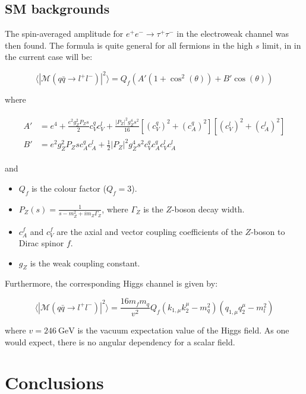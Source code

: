 \documentclass[11pt,a4paper]{article}
\begin{document}
\subsection{SM backgrounds}
The spin-averaged amplitude for $e^+e^- \rightarrow \tau^+\tau^-$ in the electroweak channel was then found. The formula is quite general for all fermions in the high $s$ limit, in in the current case will be:

\begin{equation}
	\langle|\mathcal{M}(q\bar{q}\rightarrow l^+l^-)|^2\rangle = Q_f\left(A'\left(1+\cos^2(\theta)\right) + B'\cos(\theta)\right)
\end{equation}

where

\begin{align}
	\begin{split}
	A' &= e^4 + \frac{e^2g_Z^2P_Zs}{2}c_V^qc_V^l + \frac{|P_Z|^2 g_Z^4 s^2}{16}\left[\left(c_V^q\right)^2 + \left(c_A^q\right)^2\right]\left[\left(c_V^l\right)^2 + \left(c_A^l\right)^2\right]\\
	B' &= e^2g_Z^2P_Zsc_A^qc_A^l + \frac{1}{2}|P_Z|^2g_Z^4s^2 c_V^qc_A^qc_V^l c_A^l
	\end{split}
\end{align}

and
\begin{itemize}
	\item $Q_f$ is the colour factor ($Q_f = 3$).
	\item $P_Z(s) = \frac{1}{s-m_Z^2 + im_Z\Gamma_Z}$, where $\Gamma_Z$ is the $Z$-boson decay width.
	\item $c^f_A$ and $c^f_V$ are the axial and vector coupling coefficients of the $Z$-boson to Dirac spinor $f$.
	\item $g_Z$ is the weak coupling constant.
\end{itemize}

Furthermore, the corresponding Higgs channel is given by:

\begin{equation}
	\langle|\mathcal{M}(q\bar{q}\rightarrow l^+l^-)|^2\rangle = \frac{16m_fm_q}{v^2}Q_f\left(k_{1,\mu}k_2^\mu - m_q^2\right)\left(q_{1,\mu}q_2^\mu - m_l^2\right)
\end{equation}

where $v=246\:\text{GeV}$ is the vacuum expectation value of the Higgs field. As one would expect, there is no angular dependency for a scalar field.



\section{Conclusions}
\end{document}
